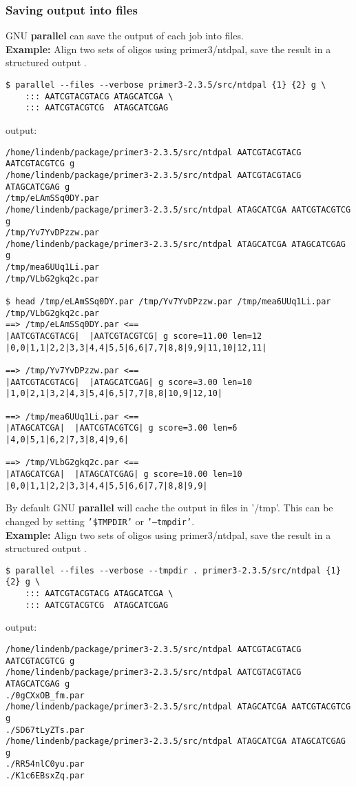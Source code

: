 \documentclass{article}
\newcommand{\example}[1]{
\textbf{Example: } {\color[rgb]{0,0,1} #1 } .
}
\newcommand{\cmdoption}[1]{\texttt{'#1'}}
\def\prl{\textbf{parallel}}
\begin{document}
\subsubsection{Saving output into files}
GNU \prl{} can save the output of each job into files.\\
\example{Align two sets of oligos using primer3/ntdpal, save the result in a structured output}
\begin{lstlisting}
$ parallel --files --verbose primer3-2.3.5/src/ntdpal {1} {2} g \
	::: AATCGTACGTACG ATAGCATCGA \
	::: AATCGTACGTCG  ATAGCATCGAG
\end{lstlisting}
output:
\begin{lstlisting}
/home/lindenb/package/primer3-2.3.5/src/ntdpal AATCGTACGTACG AATCGTACGTCG g
/home/lindenb/package/primer3-2.3.5/src/ntdpal AATCGTACGTACG ATAGCATCGAG g
/tmp/eLAmSSq0DY.par
/home/lindenb/package/primer3-2.3.5/src/ntdpal ATAGCATCGA AATCGTACGTCG g
/tmp/Yv7YvDPzzw.par
/home/lindenb/package/primer3-2.3.5/src/ntdpal ATAGCATCGA ATAGCATCGAG g
/tmp/mea6UUq1Li.par
/tmp/VLbG2gkq2c.par

$ head /tmp/eLAmSSq0DY.par /tmp/Yv7YvDPzzw.par /tmp/mea6UUq1Li.par /tmp/VLbG2gkq2c.par
==> /tmp/eLAmSSq0DY.par <==
|AATCGTACGTACG|  |AATCGTACGTCG| g score=11.00 len=12 |0,0|1,1|2,2|3,3|4,4|5,5|6,6|7,7|8,8|9,9|11,10|12,11|

==> /tmp/Yv7YvDPzzw.par <==
|AATCGTACGTACG|  |ATAGCATCGAG| g score=3.00 len=10 |1,0|2,1|3,2|4,3|5,4|6,5|7,7|8,8|10,9|12,10|

==> /tmp/mea6UUq1Li.par <==
|ATAGCATCGA|  |AATCGTACGTCG| g score=3.00 len=6 |4,0|5,1|6,2|7,3|8,4|9,6|

==> /tmp/VLbG2gkq2c.par <==
|ATAGCATCGA|  |ATAGCATCGAG| g score=10.00 len=10 |0,0|1,1|2,2|3,3|4,4|5,5|6,6|7,7|8,8|9,9|
\end{lstlisting}

By default GNU \prl{} will cache the output in files in '/tmp'. This can be changed by setting \cmdoption{\$TMPDIR} or \cmdoption{--tmpdir}.\\
\example{Align two sets of oligos using primer3/ntdpal, save the result in a structured output}
\begin{lstlisting}
$ parallel --files --verbose --tmpdir . primer3-2.3.5/src/ntdpal {1} {2} g \
	::: AATCGTACGTACG ATAGCATCGA \
	::: AATCGTACGTCG  ATAGCATCGAG
\end{lstlisting}
output:
\begin{lstlisting}
/home/lindenb/package/primer3-2.3.5/src/ntdpal AATCGTACGTACG AATCGTACGTCG g
/home/lindenb/package/primer3-2.3.5/src/ntdpal AATCGTACGTACG ATAGCATCGAG g
./0gCXxOB_fm.par
/home/lindenb/package/primer3-2.3.5/src/ntdpal ATAGCATCGA AATCGTACGTCG g
./SD67tLyZTs.par
/home/lindenb/package/primer3-2.3.5/src/ntdpal ATAGCATCGA ATAGCATCGAG g
./RR54nlC0yu.par
./K1c6EBsxZq.par
\end{lstlisting}
\end{document}

